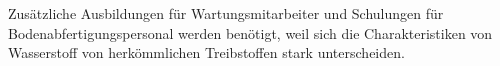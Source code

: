 %
Zusätzliche Ausbildungen für Wartungsmitarbeiter und Schulungen für Bodenabfertigungspersonal
werden benötigt, weil sich die Charakteristiken von Wasserstoff 
von herkömmlichen Treibstoffen stark unterscheiden. 
%
%
%
